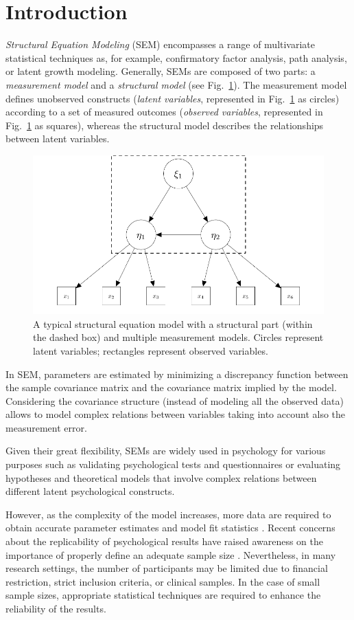 \documentclass[graybox]{svmult}
\begin{document}
\section{Introduction}
\label{sec:1}

\emph{Structural Equation Modeling} (SEM) encompasses  a range of multivariate statistical techniques as, for example, confirmatory factor analysis, path analysis, or latent growth modeling. Generally, SEMs are composed of two parts: a \emph{measurement model} and a \emph{structural model} (see Fig.~\ref{fig:example_sem}).   The measurement model defines unobserved constructs (\emph{latent variables}, represented in Fig.~\ref{fig:example_sem} as circles) according to a set of measured outcomes (\emph{observed variables}, represented in Fig.~\ref{fig:example_sem} as squares), whereas the structural model describes the relationships between latent variables.
\begin{figure}[b]
	\sidecaption
	\label{fig:example_sem}
	\includegraphics[width = .50\textwidth]{figure/Plot_SEM}
	\caption{A typical structural equation model with a structural part (within the dashed box) and multiple measurement models. Circles represent latent variables; rectangles represent observed variables.}
\end{figure}

In SEM, parameters are estimated by minimizing a discrepancy function between the sample covariance matrix and the covariance matrix implied by the model. Considering the covariance structure (instead of modeling all the observed data) allows to model complex relations between variables taking into account also the  measurement error.

Given their great flexibility, SEMs are widely used in psychology for various purposes such as validating psychological tests and questionnaires or evaluating hypotheses and theoretical models that involve complex relations between different latent psychological constructs.

However, as the complexity of the model increases, more data are required to obtain accurate parameter estimates and model fit statistics \cite{wolfSampleSizeRequirements2013}. Recent concerns about the replicability of psychological results have raised awareness on the importance of properly define an adequate sample size \cite{ioannidisWhyMostPublished2005, opensciencecollaborationEstimatingReproducibilityPsychological2015}.  Nevertheless, in many research settings, the number of participants may be limited due to financial restriction, strict inclusion criteria, or clinical samples. In the case of small sample sizes, appropriate statistical techniques are required to enhance the reliability of the results.
\end{document}
